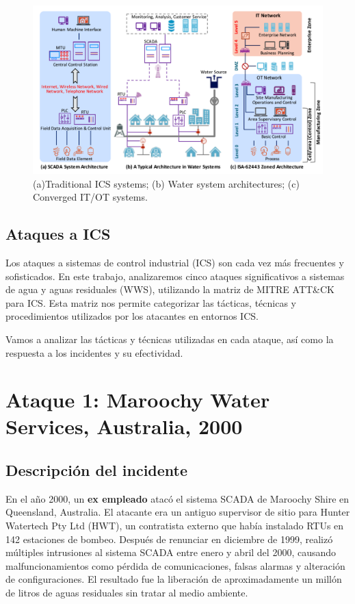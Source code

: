 \begin{figure}[htbp]
    \centering
    \includegraphics[width=\columnwidth]{images/ICSarchitecture.png}
    \caption{(a)Traditional \textsc{ICS} systems; (b) Water system architectures; (c) Converged \textsc{IT/OT} systems.}
    \label{fig:ICSarchitecture}
\end{figure}

\subsection{Ataques a ICS}
Los ataques a sistemas de control industrial (ICS) son cada vez más frecuentes y sofisticados. En este trabajo, analizaremos cinco ataques significativos a sistemas de agua y aguas residuales (\textsc{WWS}), utilizando la matriz de MITRE ATT\&CK para ICS. Esta matriz nos permite categorizar las tácticas, técnicas y procedimientos utilizados por los atacantes en entornos ICS.

Vamos a analizar las tácticas y técnicas utilizadas en cada ataque, así como la respuesta a los incidentes y su efectividad.
\newpage
\section{Ataque 1: Maroochy Water Services, Australia, 2000}

\subsection{Descripción del incidente}
En el año 2000, un \textbf{ex empleado} atacó el sistema \textsc{SCADA} de Maroochy Shire en Queensland, Australia. El atacante era un antiguo supervisor de sitio para Hunter Watertech Pty Ltd (HWT), un contratista externo que había instalado \textsc{RTU}s en 142 estaciones de bombeo. Después de renunciar en diciembre de 1999, realizó múltiples intrusiones al sistema \textsc{SCADA} entre enero y abril del 2000, causando malfuncionamientos como pérdida de comunicaciones, falsas alarmas y alteración de configuraciones. El resultado fue la liberación de aproximadamente un millón de litros de aguas residuales sin tratar al medio ambiente.
\nl

